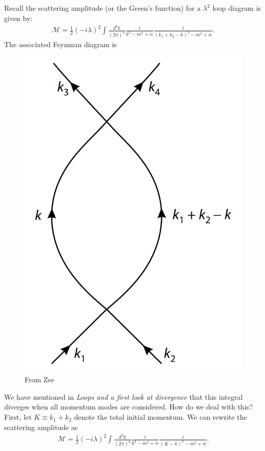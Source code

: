 \documentclass{book}
\theoremstyle{definition}
\newcommand{\f}[2]{\frac{#1}{#2}}
\begin{document}
Recall the scattering amplitude (or the Green's function) for a $\lambda^2$ loop diagram is given by:
\begin{align}
\mathcal{M} = \f{1}{2}(-i\lambda)^2\int \f{d^4k}{(2\pi)^4}\f{i}{k^2 - m^2 + i\epsilon}\f{i}{(k_1 + k_2 - k)^2 - m^2 + i\epsilon}.
\end{align}
The associated Feynman diagram is
\begin{figure}[!htb]
	\centering
	\includegraphics[scale=0.3]{loop-feynman}
	\caption{From Zee}
\end{figure}

We have mentioned in \textit{Loops and a first look at divergence} that this integral diverges when all momentum modes are considered. How do we deal with this? First, let $K \equiv k_1 + k_2$ denote the total initial momentum. We can rewrite the scattering amplitude as
\begin{align}
\mathcal{M} = \f{1}{2}(-i\lambda)^2\int \f{d^4k}{(2\pi)^4}\f{i}{k^2 - m^2 + i\epsilon}\f{i}{(K - k)^2 - m^2 + i\epsilon}.
\end{align} 
\end{document}
